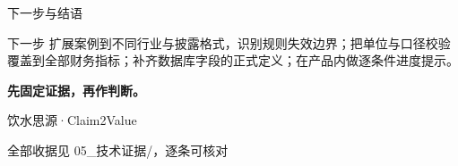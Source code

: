 \documentclass[aspectratio=169,11pt]{ctexbeamer}
\begin{document}
\begin{frame}{下一步与结语}
\vspace{0.3cm}
\begin{block}{下一步}
扩展案例到不同行业与披露格式，识别规则失效边界；把单位与口径校验覆盖到全部财务指标；补齐数据库字段的正式定义；在产品内做逐条件进度提示。
\end{block}

\vspace{0.5cm}
\begin{center}
{\Large\bfseries\color{accentc} 先固定证据，再作判断。}

\vspace{0.35cm}
{\large 饮水思源\enspace·\enspace Claim2Value}

\vspace{0.25cm}
{\small\color{muted} 全部收据见 05\_技术证据/，逐条可核对}
\end{center}
\end{frame}
\end{document}

